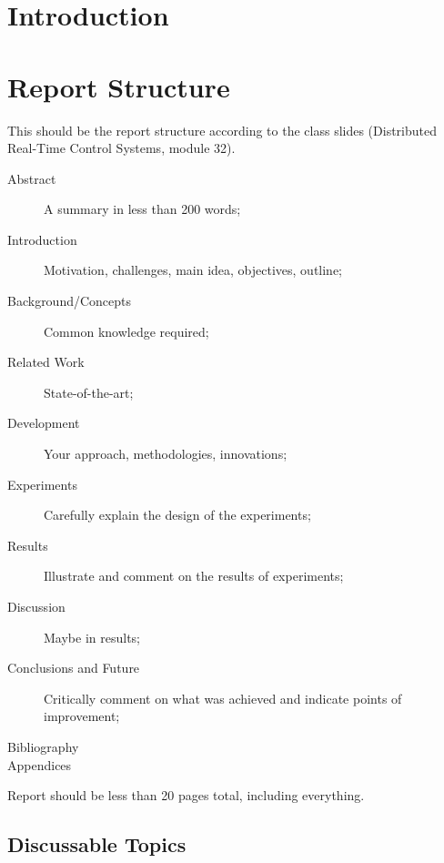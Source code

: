 \documentclass[english,fira]{ist-report}
\begin{document}
\section{Introduction}




\pagebreak
\appendix


\section{Report Structure}

This should be the report structure according to the class slides (Distributed Real-Time Control Systems, module 32).
\begin{description}
	\item[Abstract] A summary in less than 200 words;
	\item[Introduction] Motivation, challenges, main idea, objectives, outline;
	\item[Background/Concepts] Common knowledge required;
	\item[Related Work] State-of-the-art;
	\item[Development] Your approach, methodologies, innovations;
	\item[Experiments] Carefully explain the design of the experiments;
	\item[Results] Illustrate and comment on the results of experiments;
	\item[Discussion] Maybe in results;
	\item[Conclusions and Future] Critically comment on what was achieved and indicate points of improvement;
	\item[Bibliography]
	\item[Appendices]
\end{description}

Report should be less than 20 pages total, including everything.

\subsection{Discussable Topics}
\end{document}
